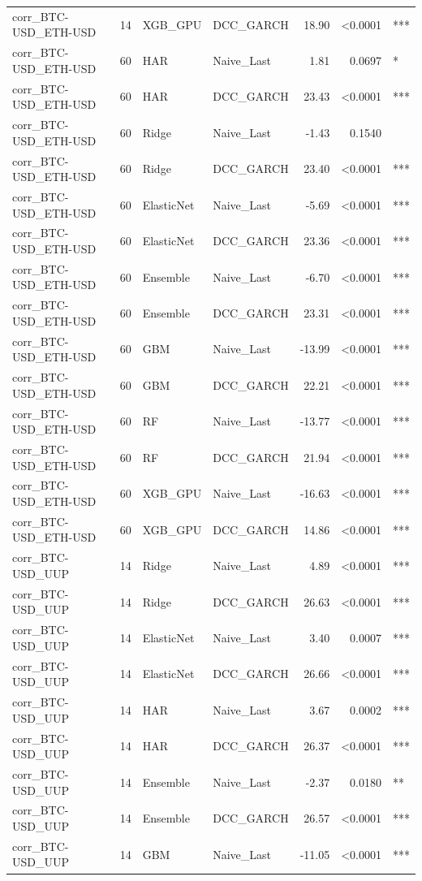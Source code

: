 \begin{table}[H]
\begin{tabular}{llllrrl}
corr_BTC-USD_ETH-USD & 14 & XGB_GPU & DCC_GARCH & 18.90 & <0.0001 & *** \\
corr_BTC-USD_ETH-USD & 60 & HAR & Naive_Last & 1.81 & 0.0697 & * \\
corr_BTC-USD_ETH-USD & 60 & HAR & DCC_GARCH & 23.43 & <0.0001 & *** \\
corr_BTC-USD_ETH-USD & 60 & Ridge & Naive_Last & -1.43 & 0.1540 &  \\
corr_BTC-USD_ETH-USD & 60 & Ridge & DCC_GARCH & 23.40 & <0.0001 & *** \\
corr_BTC-USD_ETH-USD & 60 & ElasticNet & Naive_Last & -5.69 & <0.0001 & *** \\
corr_BTC-USD_ETH-USD & 60 & ElasticNet & DCC_GARCH & 23.36 & <0.0001 & *** \\
corr_BTC-USD_ETH-USD & 60 & Ensemble & Naive_Last & -6.70 & <0.0001 & *** \\
corr_BTC-USD_ETH-USD & 60 & Ensemble & DCC_GARCH & 23.31 & <0.0001 & *** \\
corr_BTC-USD_ETH-USD & 60 & GBM & Naive_Last & -13.99 & <0.0001 & *** \\
corr_BTC-USD_ETH-USD & 60 & GBM & DCC_GARCH & 22.21 & <0.0001 & *** \\
corr_BTC-USD_ETH-USD & 60 & RF & Naive_Last & -13.77 & <0.0001 & *** \\
corr_BTC-USD_ETH-USD & 60 & RF & DCC_GARCH & 21.94 & <0.0001 & *** \\
corr_BTC-USD_ETH-USD & 60 & XGB_GPU & Naive_Last & -16.63 & <0.0001 & *** \\
corr_BTC-USD_ETH-USD & 60 & XGB_GPU & DCC_GARCH & 14.86 & <0.0001 & *** \\
corr_BTC-USD_UUP & 14 & Ridge & Naive_Last & 4.89 & <0.0001 & *** \\
corr_BTC-USD_UUP & 14 & Ridge & DCC_GARCH & 26.63 & <0.0001 & *** \\
corr_BTC-USD_UUP & 14 & ElasticNet & Naive_Last & 3.40 & 0.0007 & *** \\
corr_BTC-USD_UUP & 14 & ElasticNet & DCC_GARCH & 26.66 & <0.0001 & *** \\
corr_BTC-USD_UUP & 14 & HAR & Naive_Last & 3.67 & 0.0002 & *** \\
corr_BTC-USD_UUP & 14 & HAR & DCC_GARCH & 26.37 & <0.0001 & *** \\
corr_BTC-USD_UUP & 14 & Ensemble & Naive_Last & -2.37 & 0.0180 & ** \\
corr_BTC-USD_UUP & 14 & Ensemble & DCC_GARCH & 26.57 & <0.0001 & *** \\
corr_BTC-USD_UUP & 14 & GBM & Naive_Last & -11.05 & <0.0001 & *** \\

\end{tabular}
\end{table}
